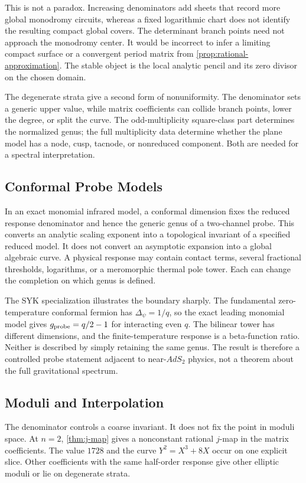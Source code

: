 \documentclass[11pt,reqno]{amsart}
\theoremstyle{remark}
\begin{document}
This is not a paradox.  Increasing denominators add sheets that record more
global monodromy circuits, whereas a fixed logarithmic chart does not identify
the resulting compact global covers.  The determinant branch points need not
approach the monodromy center.  It would be incorrect to infer a limiting
compact surface or a convergent period matrix from
\cref{prop:rational-approximation}.  The stable object is the local analytic
pencil and its zero divisor on the chosen domain.

The degenerate strata give a second form of nonuniformity.  The denominator
sets a generic upper value, while matrix coefficients can collide branch
points, lower the degree, or split the curve.  The odd-multiplicity
square-class part determines the normalized genus; the full multiplicity
data determine whether the plane model has a node, cusp, tacnode, or
nonreduced component.  Both are needed for a spectral interpretation.

\subsection{Conformal Probe Models}

In an exact monomial infrared model, a conformal dimension fixes the reduced
response denominator and hence the generic genus of a two-channel probe.
This converts an analytic scaling exponent into a topological invariant of a
specified reduced model.  It does not convert an asymptotic expansion into a
global algebraic curve.  A physical response may contain contact terms,
several fractional thresholds, logarithms, or a meromorphic thermal pole
tower.  Each can change the completion on which genus is defined.

The SYK specialization illustrates the boundary sharply.  The fundamental
zero-temperature conformal fermion has $\Delta_\psi=1/q$, so the exact leading
monomial model gives $g_{\rm probe}=q/2-1$ for interacting even $q$.  The
bilinear tower has different dimensions, and the finite-temperature response
is a beta-function ratio.  Neither is described by simply retaining the same
genus.  The result is therefore a controlled probe statement adjacent to
near-$AdS_2$ physics, not a theorem about the full gravitational spectrum.

\subsection{Moduli and Interpolation}

The denominator controls a coarse invariant.  It does not fix the point in
moduli space.  At $n=2$, \cref{thm:j-map} gives a nonconstant rational
$j$-map in the matrix coefficients.  The value $1728$ and the curve
$Y^2=X^3+8X$ occur on one explicit slice.  Other coefficients with the same
half-order response give other elliptic moduli or lie on degenerate strata.
\end{document}

